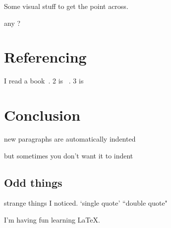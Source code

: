 \documentclass{article}
\begin{document}
Some visual stuff to get the point across.

any ? 

\section{Referencing}

I read a book~\cite{Bill2010}. 2 is ~\cite{latex}. 3 is ~\cite{Tom1980}


\section{Conclusion}

new paragraphs are automatically indented

\noindent but sometimes you don't want it to indent

\subsection{Odd things}

strange things I noticed. `single quote' ``double quote"

I'm having fun learning \LaTeX.



\end{document}
